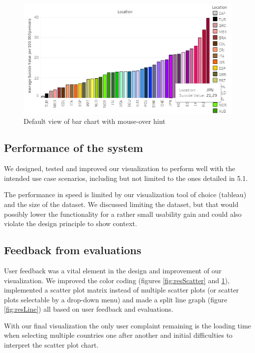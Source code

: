 \documentclass{vgtc}                          %
\begin{document}
\begin{itemize}
\begin{figure}[tb]
\centering
\includegraphics[width=\columnwidth]{image/chris/researcher06.png}
\caption{Default view of bar chart with mouse-over hint}
\label{fig:resBarChart} 
\end{figure}

\end{itemize}

\subsection{Performance of the system}
We designed, tested and improved our visualization to perform well with the intended use case scenarios, including but not limited to the ones detailed in 5.1.

The performance in speed is limited by our visualization tool of choice (tableau) and the size of the dataset. We discussed limiting the dataset, but that would possibly lower the functionality for a rather small usability gain and could also violate the design principle to show context.

\subsection{Feedback from evaluations}
User feedback was a vital element in the design and improvement of our visualization. We improved the color coding (figures \ref{fig:resScatter} and \ref{fig:resBarChart}), implemented a scatter plot matrix instead of multiple scatter plots (or scatter plots selectable by a drop-down menu) and made a split line graph (figure \ref{fig:resLine}) all based on user feedback and evaluations.

With our final visualization the only user complaint remaining is the loading time when selecting multiple countries one after another and initial difficulties to interpret the scatter plot chart.
\end{document}
